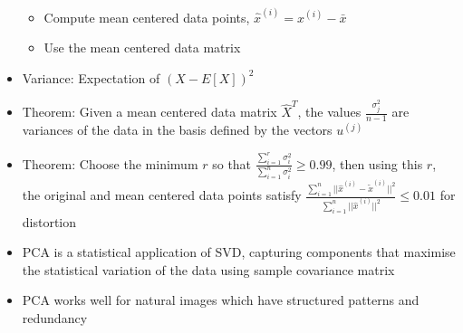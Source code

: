 \documentclass[10pt, landscape]{article}
\begin{document}
\begin{multicols*}{4}
\begin{itemize}
\begin{itemize}
        \item Compute mean centered data points, $\hat{x}^{(i)}=x^{(i)}-\bar{x}$
        \item Use the mean centered data matrix
    \end{itemize}
    \item Variance: Expectation of $(X-E[X])^2$
    \item Theorem: Given a mean centered data matrix $\hat{X}^T$, the values $\frac{\sigma_j^2}{n-1}$ are variances of the data in the basis defined by the vectors $u^{(j)}$
    \item Theorem: Choose the minimum $r$ so that $\frac{\sum_{i=1}^r \sigma_i^2}{\sum_{i=1}^n\sigma_i^2} \geq 0.99$, then using this $r$, the original and mean centered data points satisfy $\frac{\sum_{i=1}^n ||\hat{x}^{(i)}-\tilde{x}^{(i)}||^2}{\sum_{i=1}^n||\hat{x}^{(i)}||^2}\leq 0.01$ for distortion
    \item PCA is a statistical application of SVD, capturing components that maximise the statistical variation of the data using sample covariance matrix
    \item PCA works well for natural images which have structured patterns and redundancy
\end{itemize}


\end{multicols*}
\end{document}
